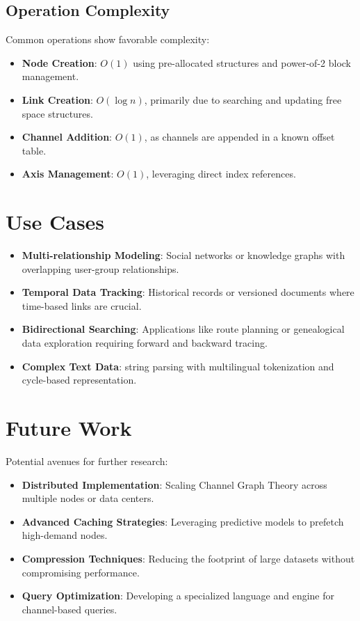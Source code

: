 \documentclass[12pt, a4paper]{article}
\begin{document}
\subsection{Operation Complexity}
Common operations show favorable complexity:
\begin{itemize}
    \item \textbf{Node Creation}: $O(1)$ using pre-allocated structures and power-of-2 block management.
    \item \textbf{Link Creation}: $O(\log n)$, primarily due to searching and updating free space structures.
    \item \textbf{Channel Addition}: $O(1)$, as channels are appended in a known offset table.
    \item \textbf{Axis Management}: $O(1)$, leveraging direct index references.
\end{itemize}

\section{Use Cases}\label{Sec:UseCases}
\begin{itemize}
    \item \textbf{Multi-relationship Modeling}: Social networks or knowledge graphs with overlapping user-group relationships.
    \item \textbf{Temporal Data Tracking}: Historical records or versioned documents where time-based links are crucial.
    \item \textbf{Bidirectional Searching}: Applications like route planning or genealogical data exploration requiring forward and backward tracing.
    \item \textbf{Complex Text Data}: string parsing with multilingual tokenization and cycle-based representation.
\end{itemize}

\section{Future Work}\label{Sec:Future}
Potential avenues for further research:
\begin{itemize}
    \item \textbf{Distributed Implementation}: Scaling Channel Graph Theory across multiple nodes or data centers.
    \item \textbf{Advanced Caching Strategies}: Leveraging predictive models to prefetch high-demand nodes.
    \item \textbf{Compression Techniques}: Reducing the footprint of large datasets without compromising performance.
    \item \textbf{Query Optimization}: Developing a specialized language and engine for channel-based queries.
\end{itemize}
\end{document}
